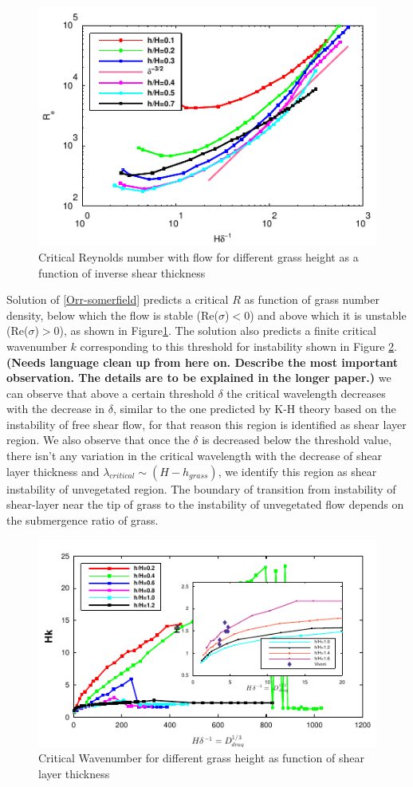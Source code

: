 \documentclass[aps,prl,twocolumn,showpacs,superscriptaddress,groupedaddress,10pt]{revtex4-1}  %
\newcommand{\shreyas}[1]{{\bf (#1)}}
\begin{document}
\begin{figure}[htb]
\includegraphics[]{Critical_Re_vs_delta}
\caption{Critical Reynolds number with flow for different grass height as a function of inverse shear thickness}
\label{Re_vs_delta}
\end{figure}
Solution of \eqref{Orr-somerfield} predicts a critical $R$ as function of grass number density, below which the flow is stable (Re($\sigma$)$<0$) and above which it is unstable (Re($\sigma$)$>0$),
as shown in Figure\ref{Re_vs_delta}. The solution also predicts a finite critical wavenumber $k$ corresponding to this threshold for instability shown in Figure \ref{K_vs_shear}. 
\shreyas{Needs language clean up from here on. Describe the most important observation. The details are to be explained in the longer paper.}
we can observe that above a 
certain threshold $\delta$ the critical wavelength decreases with the decrease in $\delta$, similar to the one predicted by K-H theory based on the instability of free shear flow, for that
reason this region is identified as shear layer region. We also observe that once the $\delta$ is decreased below the threshold value, there isn't any variation in the 
critical wavelength with the decrease of shear layer thickness and $\lambda_{critical} \sim (H-h_{grass})$, we identify this region as shear instability of unvegetated region.
The boundary of transition from instability of shear-layer near the tip of grass to the instability of unvegetated flow depends on the submergence ratio of grass. 
\begin{figure}[htb]
\includegraphics[]{K_vs_shear_width_noshear}
\caption{Critical Wavenumber for different grass height as function of shear layer thickness}
\label{K_vs_shear}
\end{figure}
\end{document}
